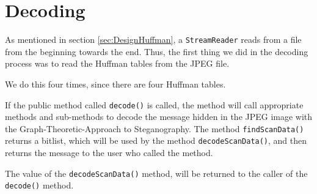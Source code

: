 \section{Decoding}
As mentioned in section \ref{sec:DesignHuffman}, a \lstinline|StreamReader| reads from a file from the beginning towards the end.
Thus, the first thing we did in the decoding process was to read the Huffman tables from the JPEG file. 

We do this four times, since there are four Huffman tables.

If the public method called \lstinline|decode()| is called, the method will call appropriate methods and sub-methods to decode the message hidden in the JPEG image with the Graph-Theoretic-Approach to Steganography.
The method \lstinline|findScanData()| returns a bitlist, which will be used by the method \lstinline|decodeScanData()|, and then returns the message to the user who called the method.


The value of the \lstinline|decodeScanData()| method, will be returned to the caller of the \lstinline|decode()| method.
